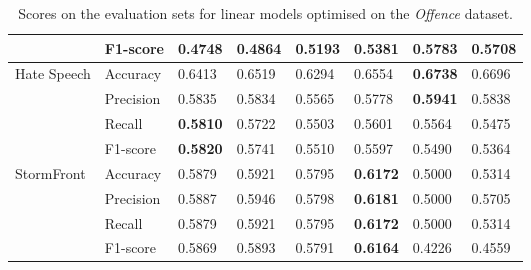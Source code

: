 \begin{table}[]
\begin{minipage}{0.42\paperheight}
{\begin{tabular}{ll|ll|ll|ll}
                                        & F1-score  & 0.4748      & 0.4864       & 0.5193 & 0.5381          & \bf{0.5783} & 0.5708      \\ \hline  
      \multirow{4}{*}{Hate Speech}      & Accuracy  & 0.6413      & 0.6519       & 0.6294 & 0.6554          & \bf{0.6738} & 0.6696      \\  
                                        & Precision & 0.5835      & 0.5834       & 0.5565 & 0.5778          & \bf{0.5941} & 0.5838      \\  
                                        & Recall    & \bf{0.5810} & 0.5722       & 0.5503 & 0.5601          & 0.5564      & 0.5475      \\  
                                        & F1-score  & \bf{0.5820} & 0.5741       & 0.5510 & 0.5597          & 0.5490      & 0.5364      \\ \hline  
      \multirow{4}{*}{StormFront}       & Accuracy  & 0.5879      & 0.5921       & 0.5795 & \bf{0.6172}     & 0.5000      & 0.5314      \\  
                                        & Precision & 0.5887      & 0.5946       & 0.5798 & \bf{0.6181}     & 0.5000      & 0.5705      \\  
                                        & Recall    & 0.5879      & 0.5921       & 0.5795 & \bf{0.6172}     & 0.5000      & 0.5314      \\  
                                        & F1-score  & 0.5869      & 0.5893       & 0.5791 & \bf{0.6164}     & 0.4226      & 0.4559  
    \end{tabular}%
    }  
    \caption{Scores on the evaluation sets for linear models optimised on the \textit{Offence} dataset.}  
    \label{tab:linear_offence_baselines}  
    \vfill  
\end{minipage}
\end{table}
